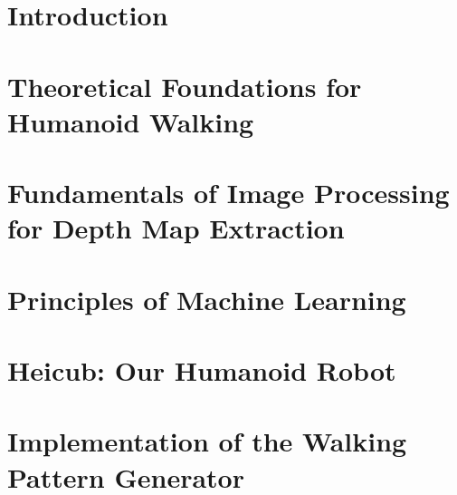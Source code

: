 \documentclass  [
paper    = a4,
BCOR     = 10mm,
twoside,
fontsize = 12pt,
toc      = bibnumbered,
toc      = listofnumbered,
numbers  = noendperiod,
headings = normal,
listof   = leveldown,
version  = 3.03
]                                       {scrreprt}
\newcommand\blankpage{
	\null
	\thispagestyle{empty}
	\addtocounter{page}{-1}
	\newpage
}
\begin{document}
	

	\afterpage{\blankpage}
	\tableofcontents
	
	\FloatBarrier
	\chapter{Introduction}
	
	
	\FloatBarrier
	\chapter{Theoretical Foundations for Humanoid Walking}

	\FloatBarrier
	\chapter{Fundamentals of Image Processing for Depth Map Extraction}
	
	\FloatBarrier
	\chapter{Principles of Machine Learning}

	\FloatBarrier
	\chapter{Heicub: Our Humanoid Robot}
	

	\FloatBarrier
	\chapter{Implementation of the Walking Pattern Generator}
	
	
	
\end{document}
